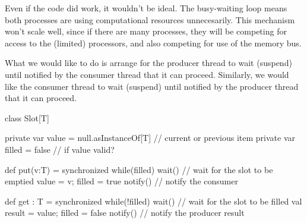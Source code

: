 
\begin{slide}

Even if the code did work, it wouldn't be ideal.
%
The busy-waiting loop means both processes are using computational resources
unnecesarily.  This mechanism won't scale well, since if there are many
processes, they will be competing for access to the (limited) processors, and
also competing for use of the memory bus.




What we would like to do is arrange for the producer thread to wait (suspend)
until notified by the consumer thread that it can proceed.  Similarly, we
would like the consumer thread to wait (suspend) until notified by the
producer thread that it can proceed.
\end{slide}


\begin{slide}

\begin{scala}
class Slot[T]{
  private var value = null.asInstanceOf[T] // current or previous item
  private var filled = false                 // if value valid?

  def put(v:T) = synchronized{
    while(filled) wait() // wait for the slot to be emptied
    value = v; filled = true
    notify()  // notify the consumer
  }

  def get : T = synchronized{
    while(!filled) wait() // wait for the slot to be filled
    val result = value; filled = false
    notify()  // notify the producer
    result
  }
}
\end{scala}
\end{slide}

